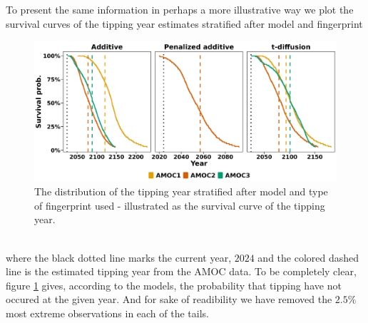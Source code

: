 To present the same information in perhaps a more illustrative way we plot the survival curves of the tipping year estimates stratified after model and fingerprint
\begin{figure}[h!]
    \begin{center}
        \includegraphics[scale = .096]{figures/surival_curve_first97.5.jpeg}
        \caption{The distribution of the tipping year stratified after model and type of fingerprint used - illustrated as the survival curve of the tipping year.}
        \label{figure:surival_curve_taus}
    \end{center}
\end{figure}\\
where the black dotted line marks the current year, $2024$ and the colored dashed line is the estimated tipping year from the AMOC data. To be completely clear, figure \ref{figure:surival_curve_taus} gives, according to the models, the probability that tipping have not occured at the given year. And for sake of readibility we have removed the $2.5\%$ most extreme observations in each of the tails.

